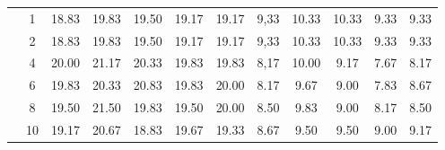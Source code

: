 \begin{table}[htpb]
\begin{tabular}{|c|c|c c c c c|c c c c c|}
\multicolumn{1}{|c|}{ \multirow{6}{*}{\rotatebox[origin=c]{90}{\textbf{K-vizinhos}}} }
&1	&18.83	&19.83	&19.50	&19.17&	19.17	&9,33	&10.33  &10.33	&9.33	&9.33\\\cline{2-12}
&2	&18.83	&19.83	&19.50	&19.17&	19.17	&9,33	&10.33  &10.33	&9.33	&9.33\\\cline{2-12}
&4	&20.00	&21.17	&20.33	&19.83&	19.83	&8,17	&10.00  &9.17	&7.67	&8.17\\\cline{2-12}
&6	&19.83	&20.33	&20.83	&19.83&	20.00	&8.17	&9.67&	9.00	&7.83	&8.67\\\cline{2-12}
&8	&19.50	&21.50	&19.83	&19.50&	20.00	&8.50	&9.83&	9.00	&8.17	&8.50\\\cline{2-12}
&10	&19.17	&20.67	&18.83	&19.67&	19.33	&8.67	&9.50&	9.50	&9.00	&9.17\\\midrule

	\end{tabular}
\end{table}



